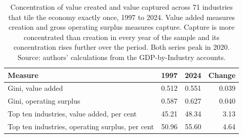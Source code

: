 \begin{table}[H]
\caption{Concentration of value created and value captured across 71 industries that tile
the economy exactly once, 1997 to 2024. Value added measures creation and gross operating
surplus measures capture. Capture is more concentrated than creation in every year of the
sample and its concentration rises further over the period. Both series peak in 2020.
Source: authors' calculations from the GDP-by-Industry accounts.}
\label{tab:concentration}
\begin{tabular}{lrrr}
\toprule
Measure & 1997 & 2024 & Change \\
\midrule
Gini, value added & 0.512 & 0.551 & $\phantom{-}$0.039 \\
Gini, operating surplus & 0.587 & 0.627 & $\phantom{-}$0.040 \\
\addlinespace
Top ten industries, value added, per cent & 45.21 & 48.34 & $\phantom{-}$3.13 \\
Top ten industries, operating surplus, per cent & 50.96 & 55.60 & $\phantom{-}$4.64 \\
\bottomrule
\end{tabular}
\end{table}

